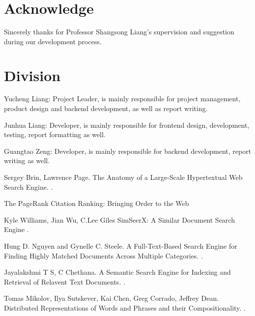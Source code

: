 \documentclass[UTF8]{article}
\begin{document}
	\section{Acknowledge}
	Sincerely thanks for Professor Shangsong Liang's supervision and suggestion during our development process.
	
	\section{Division}
	Yucheng Liang: Project Leader, is mainly responsible for project management, product design and backend development, as well as report writing. 

	Junhua Liang: Developer, is mainly responsible for frontend design, development, testing, report formatting as well.
	
	Guangtao Zeng: Developer, is mainly responsible for backend development, report writing as well.
	
	  
	\begin{thebibliography}{1}
		
		Sergey Brin, Lawrence Page.
		\newblock The Anatomy of a Large-Scale Hypertextual Web Search Engine.
		.
		
		\newblock The PageRank Citation Ranking:
		Bringing Order to the Web
		
		
		Kyle Williams, Jian Wu, C.Lee Giles
		\newblock SimSeerX: A Similar Document Search Engine
		.
		
		Hung D. Nguyen and Gynelle C. Steele.
		\newblock A Full-Text-Based Search Engine for Finding Highly Matched Documents Across Multiple Categories.
		.
		
		Jayalakshmi T S, C Chethana.
		\newblock A Semantic Search Engine for Indexing and Retrieval of Relavent Text Documents.
		.	
		
		Tomas Mikolov, Ilya Sutskever, Kai Chen, Greg Corrado, Jeffrey Dean.
		\newblock Distributed Representations of Words and Phrases and their Compositionality.
		.
		
		
		
	\end{thebibliography}
	
\end{document}
